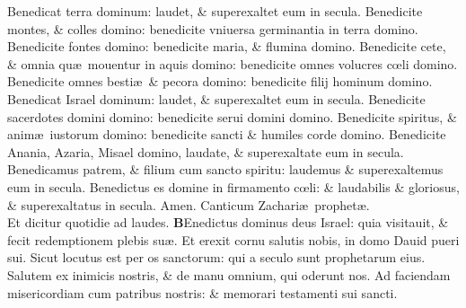 \documentclass[a5paper,10pt]{book}
\def\ae{æ}
\def\oe{œ}
\begin{document}
\begin{multicols*}{2}
\newline \color{red} B\color{black}enedicat terra dominum: laudet, \& superexaltet eum in secula.
\newline \color{red} B\color{black}enedicite montes, \& colles domino: benedicite vniuersa germinantia in terra domino.
\newline \color{red} B\color{black}enedicite fontes domino: benedicite maria, \& flumina domino.
\newline \color{red} B\color{black}enedicite cete, \& omnia qu\ae \ mouentur in aquis domino: benedicite omnes volucres c\oe li domino.
\newline \color{red} B\color{black}enedicite omnes besti\ae \ \& pecora domino: benedicite filij hominum domino.
\newline \color{red} B\color{black}enedicat Israel dominum: laudet, \& superexaltet eum in secula.
\newline \color{red} B\color{black}enedicite sacerdotes domini domino: benedicite serui domini domino.
\newline \color{red} B\color{black}enedicite spiritus, \& anim\ae \ iustorum domino: benedicite sancti \& humiles corde domino.
\newline \color{red} B\color{black}enedicite Anania, Azaria, Misael domino, laudate, \& superexaltate eum in secula.
\newline \color{red} B\color{black}enedicamus patrem, \& filium cum sancto spiritu: laudemus \& superexaltemus eum in secula.
\newline \color{red} B\color{black}enedictus es domine in firmamento c\oe li: \& laudabilis \& gloriosus, \& superexaltatus in secula. Amen.
\newline {} \color{red} \hypertarget{Benedictus}{Canticum} Zachari\ae \ prophet\ae .\\Et dicitur quotidie ad laudes. \color{black}
\vspace{-1em}
\lettrine[lines=2]{\bfseries \color{red} B}{}Enedictus dominus deus Israel: quia visitauit, \& fecit redemptionem plebis su\ae .
\newline \color{red} E\color{black}t erexit cornu salutis nobis, in domo Dauid pueri sui.
\newline \color{red} S\color{black}icut locutus est per os sanctorum: qui a seculo sunt prophetarum eius.
\newline \color{red} S\color{black}alutem ex inimicis nostris, \& de manu omnium, qui oderunt nos.
\newline \color{red} A\color{black}d faciendam misericordiam cum patribus nostris: \& memorari testamenti sui sancti.

\end{multicols*}
\end{document}

